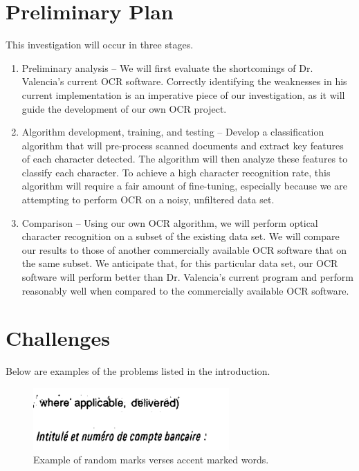 \documentclass{article}
\begin{document}
\section{Preliminary Plan}
This investigation will occur in three stages.
\begin{enumerate}
  \item Preliminary analysis -- We will first evaluate the shortcomings of Dr. Valencia's current OCR software.
  Correctly identifying the weaknesses in his current implementation is an imperative piece of our investigation, as it will guide the development of our own OCR project.
  \item Algorithm development, training, and testing -- Develop a classification algorithm that will pre-process scanned documents and extract key features of each character detected.
  The algorithm will then analyze these features to classify each character.
  To achieve a high character recognition rate, this algorithm will require a fair amount of fine-tuning, especially because we are attempting to perform OCR on a noisy, unfiltered data set.
  \item Comparison -- Using our own OCR algorithm, we will perform optical character recognition on a subset of the existing data set.
  We will compare our results to those of another commercially available OCR software that on the same subset.
  We anticipate that, for this particular data set, our OCR software will perform better than Dr. Valencia's current program and perform reasonably well when compared to the commercially available OCR software.
\end{enumerate}

\section{Challenges}
Below are examples of the problems listed in the introduction.
\begin{figure}[!ht]
  \includegraphics[width=75mm, scale=0.5]{AccentMark_Dirt.png}
  \caption{Example of random marks verses accent marked words.}
  \label{fig:boat1}
\end{figure}
\end{document}
